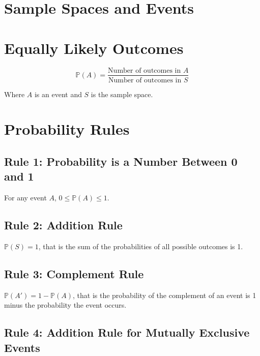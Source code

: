 \documentclass[12pt letter]{report}
\begin{document}
\section{Sample Spaces and Events}




\section{Equally Likely Outcomes}

\[
	\mathbb{P} \left( A \right) = \frac{\text{Number of outcomes in }A}{\text{Number of outcomes in } S}
\]

Where $A$ is an event and $S$ is the sample space.

\section{Probability Rules}

\subsection{Rule 1: Probability is a Number Between 0 and 1}

For any event $A$, $0 \le \mathbb{P} \left( A \right) \le 1$.


\subsection{Rule 2: Addition Rule}

$\mathbb{P} \left( S \right) = 1 $, that is the sum of the probabilities of all possible outcomes is 1.

\subsection{Rule 3: Complement Rule}

$\mathbb{P} \left( A' \right) = 1 - \mathbb{P} \left( A \right)  $, that is the probability of the complement of an event is 1 minus the
probability the event occurs.


\subsection{Rule 4: Addition Rule for Mutually Exclusive Events}
\end{document}
